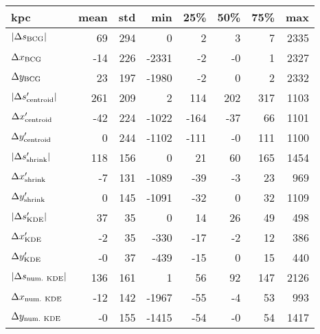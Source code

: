 \begin{tabular}{lrrrrrrr}
\toprule
kpc &  mean &  std &   min &  25\% &  50\% &  75\% &  max \\
\midrule
$|\Delta s_{\rm BCG}|$        &    69 &  294 &     0 &    2 &    3 &    7 & 2335 \\
$\Delta x_{\rm BCG}$        &   -14 &  226 & -2331 &   -2 &   -0 &    1 & 2327 \\
$\Delta y_{\rm BCG}$        &    23 &  197 & -1980 &   -2 &    0 &    2 & 2332 \\
$|\Delta s_{\rm centroid}'|$  &   261 &  209 &     2 &  114 &  202 &  317 & 1103 \\
$\Delta x_{\rm centroid}'$  &   -42 &  224 & -1022 & -164 &  -37 &   66 & 1101 \\
$\Delta y_{\rm centroid}'$  &     0 &  244 & -1102 & -111 &   -0 &  111 & 1100 \\
$|\Delta s_{\rm shrink}'|$    &   118 &  156 &     0 &   21 &   60 &  165 & 1454 \\
$\Delta x_{\rm shrink}'$    &    -7 &  131 & -1089 &  -39 &   -3 &   23 &  969 \\
$\Delta y_{\rm shrink}'$    &     0 &  145 & -1091 &  -32 &    0 &   32 & 1109 \\
$|\Delta s_{\rm KDE}'|$       &    37 &   35 &     0 &   14 &   26 &   49 &  498 \\
$\Delta x_{\rm KDE}'$       &    -2 &   35 &  -330 &  -17 &   -2 &   12 &  386 \\
$\Delta y_{\rm KDE}'$       &    -0 &   37 &  -439 &  -15 &    0 &   15 &  440 \\
$|\Delta s_{\rm num.~ KDE}|$   &   136 &  161 &     1 &   56 &   92 &  147 & 2126 \\
$\Delta x_{\rm num.~ KDE}$   &   -12 &  142 & -1967 &  -55 &   -4 &   53 &  993 \\
$\Delta y_{\rm num.~ KDE}$   &    -0 &  155 & -1415 &  -54 &   -0 &   54 & 1417 \\
\bottomrule
\end{tabular}
